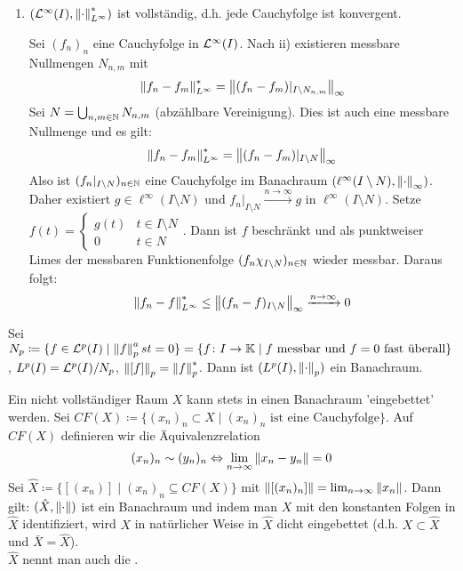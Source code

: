 \begin{beispiel*}
\begin{enumerate}
\begin{beweis}
\end{beweis}
\item $ (\mathcal L^\infty(I),\left\|\cdot\right\|^\ast_{L^\infty}) $ ist vollst\"andig, d.h. jede Cauchyfolge ist konvergent.
\begin{beweis}
Sei $ (f_n)_n $ eine Cauchyfolge in $ \mathcal L^\infty(I) $. Nach ii) existieren messbare Nullmengen $ N_{n,m} $ mit
\[ \left\|f_n-f_m\right\|_{L^\infty}^\ast=\left\|(f_n-f_m)|_{I\setminus N_{n,m}}\right\|_\infty \]
Sei $ N=\bigcup_{n,m\in\mathbb{N}} N_{n,m} $ (abz\"ahlbare Vereinigung). Dies ist auch eine messbare Nullmenge und es gilt:
\[ \left\|f_n-f_m\right\|^\ast_{L^\infty}=\left\|(f_n-f_m)|_{I\setminus N}\right\|_\infty \]
Also ist $ (f_n|_{I\setminus N})_{n\in\mathbb{N}} $ eine Cauchyfolge im Banachraum $ (\ell^\infty(I\setminus N),\left\|\cdot\right\|_\infty) $. Daher existiert $ g\in\ell^\infty(I\setminus N) $ und $ f_n|_{I\setminus N}\xrightarrow{n\to\infty}g $ in $ \ell^\infty(I\setminus N) $. Setze $ f(t)= \begin{cases}
g(t)&t\in I\setminus N\\0&t\in N
\end{cases} $. Dann ist $ f $ beschr\"ankt und als punktweiser Limes der messbaren Funktionenfolge $ (f_n\chi_{I\setminus N})_{n\in\mathbb{N}} $ wieder messbar. Daraus folgt:
\[ \left\|f_n-f\right\|^\ast_{L^\infty}\leq\left\|(f_n-f)_{I\setminus N}\right\|_\infty\xrightarrow{n\to\infty}0 \]
\end{beweis}
\end{enumerate}
\end{beispiel*}
Sei $ N_p\coloneqq\lbrace f\in\mathcal L^p(I)\mid\left\|f\right\|_p^ast=0\rbrace =\lbrace f\colon I\rightarrow\mathbb{K}\mid f\text{ messbar und } f=0\text{ fast \"uberall}\rbrace $, $ L^p(I)=\mathcal L^p(I)/N_p $, $ \left\|[f]\right\|_p=\left\|f\right\|_p^\ast $. Dann ist $ (L^p(I), \left\|\cdot\right\|_p) $ ein Banachraum.
\begin{bemerkung*}
Ein nicht vollst\"andiger Raum $ X $ kann stets in einen Banachraum 'eingebettet' werden. Sei $ CF(X)\coloneqq\lbrace (x_n)_n\subset X\mid (x_n)_n\text{ ist eine Cauchyfolge}\rbrace $. Auf $ CF(X) $ definieren wir die \"Aquivalenzrelation
\[ (x_n)_n\sim(y_n)_n\Leftrightarrow\lim_{n\to\infty}\left\|x_n-y_n\right\|=0 \]
Sei $ \hat X\coloneqq\lbrace [(x_n)]\mid (x_n)_n\subseteq CF(X)\rbrace $ mit $ \left\|[(x_n)_n]\right\|=\lim_{n\to\infty}\left\|x_n\right\| $. Dann gilt: $ (\hat X,\left\|\cdot\right\|) $ ist ein Banachraum und indem man $ X $ mit den konstanten Folgen in $ \hat X $ identifiziert, wird $ X $ in nat\"urlicher Weise in $ \hat X $ dicht eingebettet (d.h. $ X\subset \hat X $ und $ \bar X=\hat X $).\\
$ \hat X $ nennt man auch die .
\end{bemerkung*}

